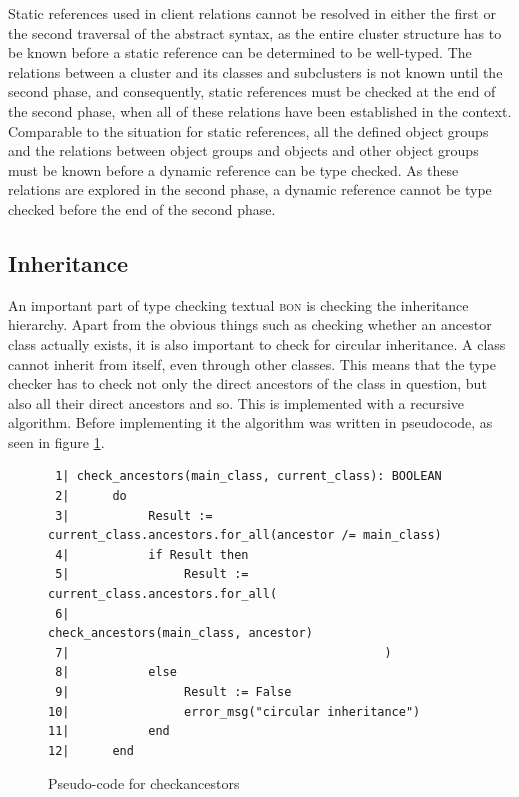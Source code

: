 Static references used in client relations cannot be resolved in either the first or the second traversal of the abstract syntax, as the entire cluster structure has to be known before a static reference can be determined to be well-typed. The relations between a cluster and its classes and subclusters is not known until the second phase, and consequently, static references must be checked at the end of the second phase, when all of these relations have been established in the context.
Comparable to the situation for static references, all the defined object groups and the relations between object groups and objects and other object groups must be known before a dynamic reference can be type checked. As these relations are explored in the second phase, a dynamic reference cannot be type checked before the end of the second phase.

\subsection{Inheritance}
An important part of type checking textual \textsc{bon} is checking the inheritance hierarchy. Apart from the obvious things such as checking whether an ancestor class actually exists, it is also important to check for circular inheritance. A class cannot inherit from itself, even through other classes. This means that the type checker has to check not only the direct ancestors of the class in question, but also all their direct ancestors and so. This is implemented with a recursive algorithm. Before implementing it the algorithm was written in pseudocode, as seen in figure \ref{fig:check_ancestors_pseudocode}.
\begin{figure}[h]
{\footnotesize
\begin{verbatim}
 1| check_ancestors(main_class, current_class): BOOLEAN
 2|      do
 3|           Result := current_class.ancestors.for_all(ancestor /= main_class)
 4|           if Result then
 5|                Result := current_class.ancestors.for_all(
 6|                                            check_ancestors(main_class, ancestor)
 7|                                            )
 8|           else
 9|                Result := False
10|                error_msg("circular inheritance")
11|           end
12|      end
\end{verbatim}
}
\caption{Pseudo-code for check\textunderscore ancestors}
\label{fig:check_ancestors_pseudocode}
\end{figure}


